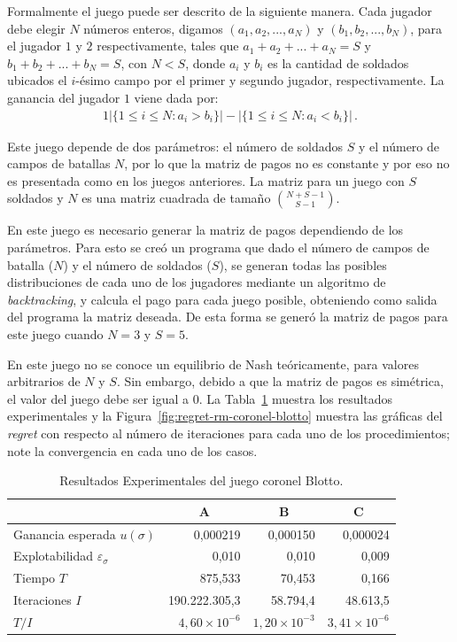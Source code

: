 Formalmente el juego puede ser descrito de la siguiente manera. Cada jugador debe elegir $N$ números enteros, digamos $(a_1, a_2, ..., a_N)$ y $(b_1, b_2, ..., b_N)$, para el jugador $1$ y $2$ respectivamente, tales que $a_1 + a_2 + ... + a_N = S$ y $b_1 + b_2 + ... + b_N = S$, con $N < S$, donde $a_i$ y $b_i$ es la cantidad de soldados ubicados el $i$-ésimo campo por el primer y segundo jugador, respectivamente. La ganancia del jugador $1$ viene dada por:
\begin{alignat}{1}
|\{ 1 \leq i \leq N : a_i > b_i\}| - |\{ 1 \leq i \leq N : a_i < b_i\}| \,.
\end{alignat}

Este juego depende de dos parámetros: el número de soldados $S$ y el número de campos de batallas $N$, por lo que la matriz de pagos no es constante y por eso no es presentada como en los juegos anteriores. La matriz para un juego con $S$ soldados y $N$ es una matriz cuadrada de tamaño $\binom{N+S-1}{S-1}$.

En este juego es necesario generar la matriz de pagos dependiendo de los parámetros. Para esto se creó un programa que dado el número de campos de batalla ($N$) y el número de soldados ($S$), se generan todas las posibles distribuciones de cada uno de los jugadores mediante un algoritmo de \textit{backtracking}, y calcula el pago para cada juego posible, obteniendo como salida del programa la matriz deseada. De esta forma se generó la matriz de pagos para este juego cuando $N = 3$ y $S = 5$.

En este juego no se conoce un equilibrio de Nash teóricamente, para valores arbitrarios de $N$ y $S$. Sin embargo, debido a que la matriz de pagos es simétrica, el valor del juego debe ser igual a $0$. La Tabla~\ref{table:resultados-rm-blotto} muestra los resultados experimentales y la Figura~\ref{fig:regret-rm-coronel-blotto} muestra las gráficas del \textit{regret} con respecto al número de iteraciones para cada uno de los procedimientos; note la convergencia en cada uno de los casos.

\begin{table}[t]
\caption{Resultados Experimentales del juego coronel Blotto.}
\label{table:resultados-rm-blotto}
\centering
\begin{tabular}{l r r r}
    \toprule
    & \multicolumn{1}{c}{A} & \multicolumn{1}{c}{B} & \multicolumn{1}{c}{C} \\ \midrule
    Ganancia esperada $u(\sigma)$ & 0,000219 & 0,000150 & 0,000024 \\
    Explotabilidad $\varepsilon_{\sigma}$ & 0,010 & 0,010 & 0,009  \\
    Tiempo $T$ &  875,533 &  70,453 & 0,166 \\
    Iteraciones $I$ &  190.222.305,3 & 58.794,4  & 48.613,5 \\
    $T/I$ & $4,60{\times}10^{-6}$ & $1,20{\times}10^{-3}$ & $3,41{\times}10^{-6}$\\
    \bottomrule
\end{tabular}
\end{table}

